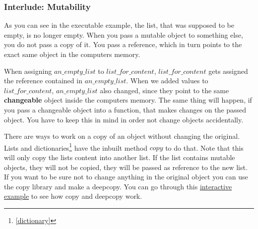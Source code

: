 \documentclass{article}
\begin{document}
\subsubsection{Interlude: Mutability}

As you can see in the executable example, the list, that was supposed to be empty, is no longer empty.
When you pass a mutable object to something else, you do not pass a copy of it.
You pass a reference, which in turn points to the exact same object in the computers memory.

When assigning $an\_empty\_list$ to $list\_for\_content$, $list\_for\_content$ gets assigned
the reference contained in $an\_empty\_list$.
When we added values to $list\_for\_content$, $an\_empty\_list$ also changed, since they
point to the same \textbf{changeable} object inside the computers memory.
The same thing will happen, if you pass a changeable object into a function, that
makes changes on the passed object.
You have to keep this in mind in order not change objects accidentally.

There are ways to work on a copy of an object without changing the original.
Lists and dictionaries\footnote{\ref{dictionary}} have the inbuilt method $copy$
to do that.
Note that this will only copy the lists content into another list.
If the list contains mutable objects, they will not be copied, they will be passed
as reference to the new list.
If you want to be sure not to change anything in the original object you can use
the copy library and make a deepcopy.
You can go through this \href{http://pythontutor.com/visualize.html#code=an_empty_list%20%3D%20list%28%29%0Aanother_empty_list%20%3D%20%5B%5D%0A%0Alist_for_content%20%3D%20an_empty_list.copy%28%29%0Alist_for_content.append%281%29%0A%23%20The%20name%20of%20an_empty_list%20is%20now%20a%20lie.%0Alist_for_content.append%282%29%0Alist_for_content.append%283%29%0A%0Aa_list_with_content%20%3D%20%5B1%20,2%20,3%5D%0A%0Aprint%28an_empty_list%29%0Aprint%28another_empty_list%29%0Aprint%28list_for_content%29%0Aprint%28a_list_with_content%29%0A%0Aprint%28len%28an_empty_list%29%29%0A%0Aimport%20copy%0A%0Aa_list_of_empty_lists%20%3D%20%5B%0A%20%20%20%20an_empty_list,%0A%20%20%20%20another_empty_list%0A%5D%0A%0Aa_list_copy%20%3D%20a_list_of_empty_lists.copy%28%29%0Aa_list_deepcopy%20%3D%20copy.deepcopy%28a_list_of_empty_lists%29%0Aa_list_copy.append%28%5B1,2,3%5D%29%0Aa_list_copy%5B0%5D.append%281%29%20%23%20This%20will%20change%20the%20original%20an_empty_list&cumulative=false&curInstr=15&heapPrimitives=nevernest&mode=display&origin=opt-frontend.js&py=3&rawInputLstJSON=%5B%5D&textReferences=false}
{interactive example} to see how copy and deepcopy work.
\end{document}
